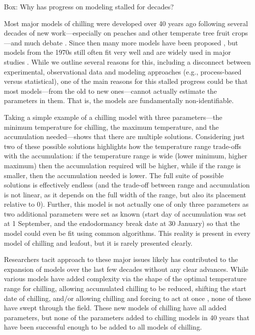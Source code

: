 \documentclass[11pt]{article}
\begin{document}
\vspace{10ex}
{\sc Box: Why has progress on modeling stalled for decades?} %

Most major models of chilling were developed over 40 years ago \citep{richardson1974,chuine2016} following several decades of new work---especially on peaches and other temperate tree fruit crops---and much debate \citep{dormtreeproc}. Since then many more models have been proposed \citep{luedeling2012chilling,chuine2016}, but models from the 1970s still often fit very well \citep{basler2016evaluating,chuine2016} and are widely used in major studies \citep[e.g.,][]{richardson1974,chuine2016,ospreebbms}. While we outline several reasons for this, including a disconnect between experimental, observational data and modeling approaches (e.g., process-based versus statistical), one of the main reasons for this stalled progress could be that most models---from the old to new ones---cannot actually estimate the parameters in them. That is, the models are fundamentally non-identifiable.

Taking a simple example of a chilling model with three parameters---the minimum temperature for chilling, the maximum temperature, and the accumulation needed---shows that there are multiple solutions. Considering just two of these possible solutions highlights how the temperature range trade-offs with the accumulation: if the temperature range is wide (lower minimum, higher maximum) then the accumulation required will be higher, while if the range is smaller, then the accumulation needed is lower. The full suite of possible solutions is effectively endless (and the trade-off between range and accumulation is not linear, as it depends on the full width of the range, but also its placement relative to 0). Further, this model is not actually one of only three parameters as two additional parameters were set as known (start day of accumulation was set at 1 September, and the endodormancy break date at 30 January) so that the model could even be fit using common algorithms. %
This reality is present in every model of chilling and leafout, but it is rarely presented clearly. %

Researchers tacit approach to these major issues likely has contributed to the expansion of models over the last few decades without any clear advances. While various models have added complexity via the shape of the optimal temperature range for chilling, allowing accumulated chilling to be reduced, shifting the start date of chilling, and/or allowing chilling and forcing to act at once \citep{lued2009,gusewell2017,hanninen1990modelling,Kramer1994}, none of these have swept through the field. These new models of chilling have all added parameters, but none of the parameters added to chilling models in 40 years that have been successful enough to be added to all models of chilling. 
\end{document}
